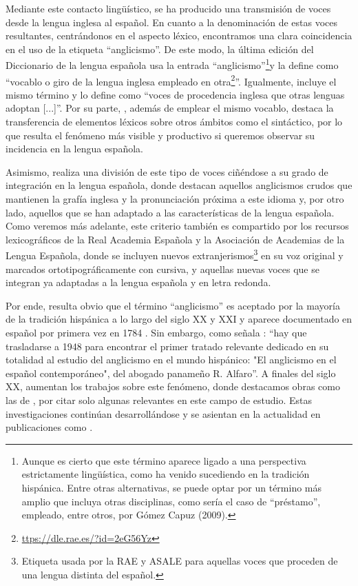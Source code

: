 \documentclass{textolivre}
\begin{document}
Mediante este contacto lingüístico, se ha producido una transmisión de voces desde la lengua inglesa al español. En cuanto a la denominación de estas voces resultantes, centrándonos en el aspecto léxico, encontramos una clara coincidencia en el uso de la etiqueta “anglicismo”. De este modo, la última edición del Diccionario de la lengua española \cite{real2014diccionario} usa la entrada “anglicismo”\footnote{
Aunque es cierto que este término aparece ligado a una perspectiva estrictamente lingüística, como ha venido sucediendo en la tradición hispánica. Entre otras alternativas, se puede optar por un término más amplio que incluya otras disciplinas, como sería el caso de “préstamo”, empleado, entre otros, por Gómez Capuz (2009).
}y la define como “vocablo o giro de la lengua inglesa empleado en otra\footnote{
\url{ttps://dle.rae.es/?id=2eG56Yz}
}”. Igualmente, \textcite[p. 277]{amador2015} incluye el mismo término y lo define como “voces de procedencia inglesa que otras lenguas adoptan [...]”. Por su parte, \textcite{capuz2000}, además de emplear el mismo vocablo, destaca la transferencia de elementos léxicos sobre otros ámbitos como el sintáctico, por lo que resulta el fenómeno más visible y productivo si queremos observar su incidencia en la lengua española.

Asimismo, \textcite{lorenzo1987} realiza una división de este tipo de voces ciñéndose a su grado de integración en la lengua española, donde destacan aquellos anglicismos crudos que mantienen la grafía inglesa y la pronunciación próxima a este idioma y, por otro lado, aquellos que se han adaptado a las características de la lengua española. Como veremos más adelante, este criterio también es compartido por los recursos lexicográficos de la Real Academia Española y la Asociación de Academias de la Lengua Española, donde se incluyen nuevos extranjerismos\footnote{
Etiqueta usada por la RAE y ASALE para aquellas voces que proceden de una lengua distinta del español.
} en su voz original y marcados ortotipográficamente con cursiva, y aquellas nuevas voces que se integran ya adaptadas a la lengua española y en letra redonda.

Por ende, resulta obvio que el término “anglicismo” es aceptado por la mayoría de la tradición hispánica a lo largo del siglo XX y XXI y aparece documentado en español por primera vez en 1784 \cite[p. 13]{Lorenzo1996}. Sin embargo, como señala \textcite[p. 99]{RodrguezMedina2000}: “hay que trasladarse a 1948 para encontrar el primer tratado relevante dedicado en su totalidad al estudio del anglicismo en el mundo hispánico: "El anglicismo en el español contemporáneo", del abogado panameño R. Alfaro”.  A finales del siglo XX, aumentan los trabajos sobre este fenómeno, donde destacamos obras como las de \textcite{pratt1980,lorenzo1987,Lorenzo1996,medina1996,salavador1994,rodriguez1997,riquelme1998,capuz1998}, por citar solo algunas relevantes en este campo de estudio. Estas investigaciones continúan desarrollándose y se asientan en la actualidad en publicaciones como \textcite{navarro2006,capuz2009,rodriguez2013,rodriguez2017,rodriguez2018,rodriguez2019,amador2014,amador2015,moreno2018,moreno2018b}.
\end{document}
